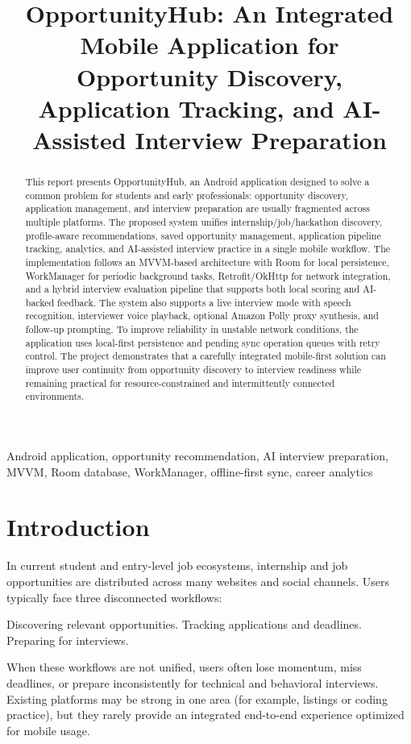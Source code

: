 \documentclass[conference]{IEEEtran}
\title{OpportunityHub: An Integrated Mobile Application for Opportunity Discovery, Application Tracking, and AI-Assisted Interview Preparation}
\author{
\IEEEauthorblockN{Dhruv Maheshwari (230953526) \\
Manas Laxman Kudipady (230953530) \\
Mayur Das (230953414) \\
Priyanshu Sharma (230953520)}
\IEEEauthorblockA{School of Computer Engineering \\
Manipal Institute of Technology, Manipal, India}
}
\begin{document}
\maketitle

\begin{abstract}
This report presents OpportunityHub, an Android application designed to solve a common problem for students and early professionals: opportunity discovery, application management, and interview preparation are usually fragmented across multiple platforms. The proposed system unifies internship/job/hackathon discovery, profile-aware recommendations, saved opportunity management, application pipeline tracking, analytics, and AI-assisted interview practice in a single mobile workflow. The implementation follows an MVVM-based architecture with Room for local persistence, WorkManager for periodic background tasks, Retrofit/OkHttp for network integration, and a hybrid interview evaluation pipeline that supports both local scoring and AI-backed feedback. The system also supports a live interview mode with speech recognition, interviewer voice playback, optional Amazon Polly proxy synthesis, and follow-up prompting. To improve reliability in unstable network conditions, the application uses local-first persistence and pending sync operation queues with retry control. The project demonstrates that a carefully integrated mobile-first solution can improve user continuity from opportunity discovery to interview readiness while remaining practical for resource-constrained and intermittently connected environments.
\end{abstract}

\begin{IEEEkeywords}
Android application, opportunity recommendation, AI interview preparation, MVVM, Room database, WorkManager, offline-first sync, career analytics
\end{IEEEkeywords}

\section{Introduction}

In current student and entry-level job ecosystems, internship and job opportunities are distributed across many websites and social channels. Users typically face three disconnected workflows:

Discovering relevant opportunities. Tracking applications and deadlines. Preparing for interviews.

When these workflows are not unified, users often lose momentum, miss deadlines, or prepare inconsistently for technical and behavioral interviews. Existing platforms may be strong in one area (for example, listings or coding practice), but they rarely provide an integrated end-to-end experience optimized for mobile usage.
\end{document}
